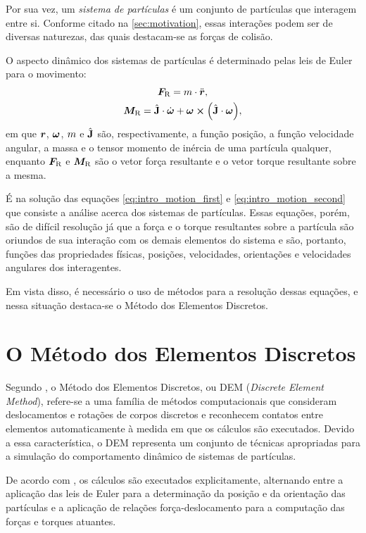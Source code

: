 Por sua vez, um \textit{sistema de partículas} é um conjunto de partículas que interagem entre si. Conforme citado na \autoref{sec:motivation}, essas interações podem ser de diversas naturezas, das quais destacam-se as forças de colisão.

O aspecto dinâmico dos sistemas de partículas é determinado pelas leis de Euler para o movimento:
\begin{gather}
	{\resultingForce} = \mass\cdot\acceleration, \label{eq:intro_motion_first}\\
	{\resultingTorque} = \tensorOfInertia\cdot\deriv{1}{\angularVelocity} + \angularVelocity\cross\pqty{\tensorOfInertia\cdot\angularVelocity}, \label{eq:intro_motion_second}
\end{gather}
em que \(\bm{r}\), \(\bm{\omega}\), \(m\) e \(\hat{\mathbf{J}}\) são, respectivamente, a função posição, a função velocidade angular, a massa e o tensor momento de inércia de uma partícula qualquer, enquanto \({\bm{F}_{\text{R}}}\) e \({\bm{M}_{\text{R}}}\) são o vetor força resultante e o vetor torque resultante sobre a mesma.

É na solução das equações \eqref{eq:intro_motion_first} e \eqref{eq:intro_motion_second} que consiste a análise acerca dos sistemas de partículas. Essas equações, porém, são de difícil resolução já que a força e o torque resultantes sobre a partícula são oriundos de sua interação com os demais elementos do sistema e são, portanto, funções das propriedades físicas, posições, velocidades, orientações e velocidades angulares dos interagentes.

Em vista disso, é necessário o uso de métodos para a resolução dessas equações, e nessa situação destaca-se o Método dos Elementos Discretos.

\section{O Método dos Elementos Discretos} 

Segundo , o Método dos Elementos Discretos, ou DEM (\textit{Discrete Element Method}), refere-se a uma família de métodos computacionais que consideram deslocamentos e rotações de corpos discretos e reconhecem contatos entre elementos automaticamente à medida em que os cálculos são executados. Devido a essa característica, o DEM representa um conjunto de técnicas apropriadas para a simulação do comportamento dinâmico de sistemas de partículas.

De acordo com , os cálculos são executados explicitamente, alternando entre a aplicação das leis de Euler para a determinação da posição e da orientação das partículas e a aplicação de relações força-deslocamento para a computação das forças e torques atuantes.

